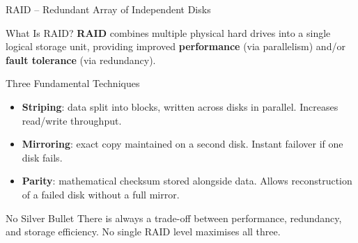 \begin{frame}{RAID -- Redundant Array of Independent Disks}
  \begin{block}{What Is RAID?}
    \textbf{RAID} combines multiple physical hard drives into a single logical
    storage unit, providing improved \textbf{performance} (via parallelism)
    and/or \textbf{fault tolerance} (via redundancy).
  \end{block}

  \begin{block}{Three Fundamental Techniques}
    \begin{itemize}
      \item \textbf{Striping}: data split into blocks, written across disks in parallel.
            Increases read/write throughput.
      \item \textbf{Mirroring}: exact copy maintained on a second disk.
            Instant failover if one disk fails.
      \item \textbf{Parity}: mathematical checksum stored alongside data.
            Allows reconstruction of a failed disk without a full mirror.
    \end{itemize}
  \end{block}

  \begin{alertblock}{No Silver Bullet}
    There is always a trade-off between performance, redundancy, and storage
    efficiency. No single RAID level maximises all three.
  \end{alertblock}
\end{frame}

